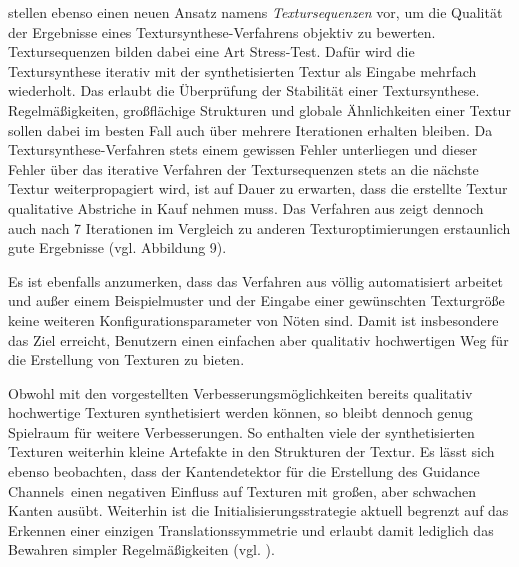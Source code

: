 \cite{SelfTuning} stellen ebenso einen neuen Ansatz namens \emph{Textursequenzen} vor, um die Qualität der Ergebnisse eines Textursynthese-Verfahrens objektiv zu bewerten.
Textursequenzen bilden dabei eine Art \glqq Stress-Test\grqq.
Dafür wird die Textursynthese iterativ mit der synthetisierten Textur als Eingabe mehrfach wiederholt.
Das erlaubt die Überprüfung der Stabilität einer Textursynthese.
Regelmäßigkeiten, großflächige Strukturen und globale Ähnlichkeiten einer Textur sollen dabei im besten Fall auch über mehrere Iterationen erhalten bleiben.
Da Textursynthese-Verfahren stets einem gewissen Fehler unterliegen und dieser Fehler über das iterative Verfahren der Textursequenzen stets an die nächste Textur weiterpropagiert wird, ist auf Dauer zu erwarten, dass die erstellte Textur qualitative Abstriche in Kauf nehmen muss.
Das Verfahren aus \cite{SelfTuning} zeigt dennoch auch nach 7 Iterationen im Vergleich zu anderen Texturoptimierungen erstaunlich gute Ergebnisse (vgl. Abbildung 9).

Es ist ebenfalls anzumerken, dass das Verfahren aus \cite{SelfTuning} völlig automatisiert arbeitet und außer einem Beispielmuster und der Eingabe einer gewünschten Texturgröße keine weiteren Konfigurationsparameter von Nöten sind.
Damit ist insbesondere das Ziel erreicht, Benutzern einen einfachen aber qualitativ hochwertigen Weg für die Erstellung von Texturen zu bieten.

Obwohl mit den vorgestellten Verbesserungsmöglichkeiten bereits qualitativ hochwertige Texturen synthetisiert werden können, so bleibt dennoch genug Spielraum für weitere Verbesserungen.
So enthalten viele der synthetisierten Texturen weiterhin kleine Artefakte in den Strukturen der Textur.
Es lässt sich ebenso beobachten, dass der Kantendetektor für die Erstellung des \glqq Guidance Channels\grqq \ einen negativen Einfluss auf Texturen mit großen, aber schwachen Kanten ausübt.
Weiterhin ist die Initialisierungsstrategie aktuell begrenzt auf das Erkennen einer einzigen Translationssymmetrie und erlaubt damit lediglich das Bewahren simpler Regelmäßigkeiten (vgl. \cite{SelfTuning}).

